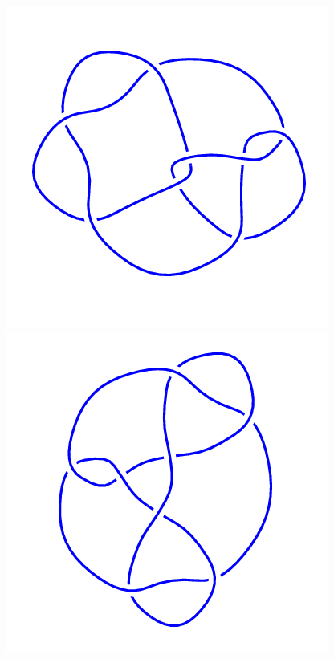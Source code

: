 \begin{figure}[H]
\begin{minipage}[b]{.18\linewidth}
    \end{minipage}
    \begin{minipage}[b]{.18\linewidth}
        \centering
        \includegraphics[width=\linewidth]{../data/8_19.png}
    \end{minipage}
    \begin{minipage}[b]{.18\linewidth}
        \centering
        \includegraphics[width=\linewidth]{../data/8_20.png}

\end{minipage}
\end{figure}
